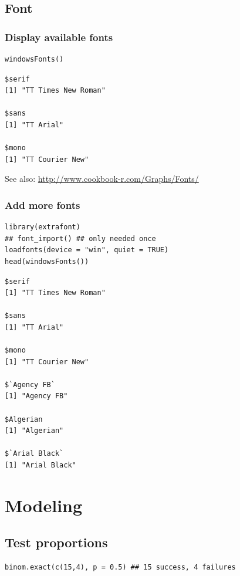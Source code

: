 \documentclass{article}
\begin{document}
\subsection{Font}
\label{sec:org66c6812}
\subsubsection{Display available fonts}
\label{sec:orge4df73c}
\lstset{language=r,label= ,caption= ,captionpos=b,numbers=none}
\begin{lstlisting}
windowsFonts()
\end{lstlisting}

\begin{verbatim}
$serif
[1] "TT Times New Roman"

$sans
[1] "TT Arial"

$mono
[1] "TT Courier New"
\end{verbatim}


See also: \url{http://www.cookbook-r.com/Graphs/Fonts/}

\subsubsection{Add more fonts}
\label{sec:orgdc3c944}
\lstset{language=r,label= ,caption= ,captionpos=b,numbers=none}
\begin{lstlisting}
library(extrafont)
## font_import() ## only needed once
loadfonts(device = "win", quiet = TRUE)
head(windowsFonts())
\end{lstlisting}

\begin{verbatim}
$serif
[1] "TT Times New Roman"

$sans
[1] "TT Arial"

$mono
[1] "TT Courier New"

$`Agency FB`
[1] "Agency FB"

$Algerian
[1] "Algerian"

$`Arial Black`
[1] "Arial Black"
\end{verbatim}

\section{Modeling}
\label{sec:orgfc9cfed}
\subsection{Test proportions}
\label{sec:org1ef4a28}
\lstset{language=r,label= ,caption= ,captionpos=b,numbers=none}
\begin{lstlisting}
binom.exact(c(15,4), p = 0.5) ## 15 success, 4 failures
\end{lstlisting}
\end{document}
